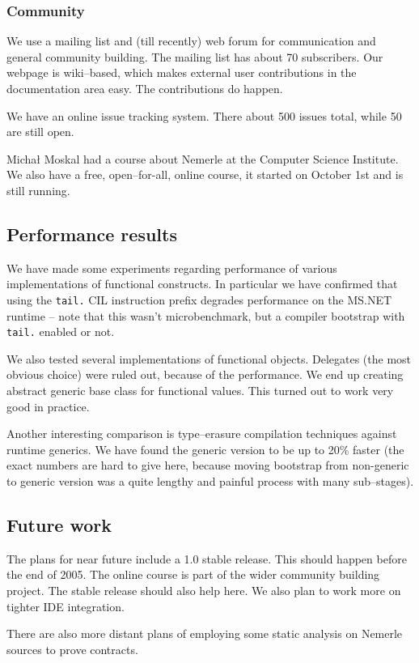 \documentclass{article}
\begin{document}
\subsubsection{Community}

We use a mailing list and (till recently) web forum for communication
and general community building. The mailing list has about 70 subscribers.
Our webpage is wiki--based, which makes external user contributions
in the documentation area easy. The contributions do happen.

We have an online issue tracking system. There about 500 issues
total, while 50 are still open.

Micha{\l} Moskal had a course about Nemerle at the Computer Science
Institute. We also have a free, open--for-all, online course,
it started on October 1st and is still running.

\subsection{Performance results}

We have made some experiments regarding performance of various
implementations of functional constructs. In particular we have confirmed
that using the {\tt tail.} CIL instruction prefix degrades performance
on the MS.NET runtime -- note that this wasn't microbenchmark, but
a compiler bootstrap with {\tt tail.} enabled or not.

We also tested several implementations of functional objects. Delegates
(the most obvious choice) were ruled out, because of the performance.
We end up creating abstract generic base class for functional values.
This turned out to work very good in practice.

Another interesting comparison is type--erasure compilation techniques
against runtime generics. We have found the generic version to be up
to 20\% faster (the exact numbers are hard to give here, because moving
bootstrap from non-generic to generic version was a quite lengthy
and painful process with many sub--stages).

\subsection{Future work}

The plans for near future include a 1.0 stable release. This should happen
before the end of 2005. The online course is part of the wider community
building project. The stable release should also help here. We also plan to
work more on tighter IDE integration.

There are also more distant plans of employing some static analysis on
Nemerle sources to prove contracts.
\end{document}
